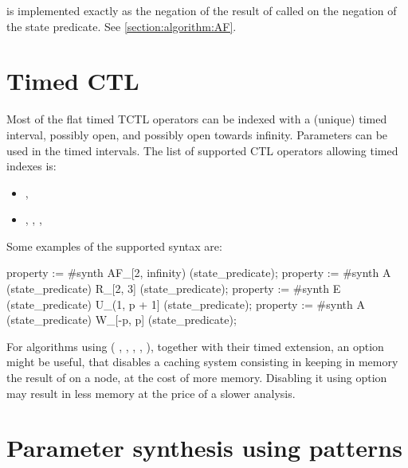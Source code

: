  is implemented exactly as the negation of the result of  called on the negation of the state predicate.
See \cref{section:algorithm:AF}.


\section{Timed CTL}\label{section:algorithm:timedCTL}

Most of the flat timed TCTL operators can be indexed with a (unique) timed interval, possibly open, and possibly open towards infinity.
Parameters can be used in the timed intervals.
The list of supported CTL operators allowing timed indexes is:
\begin{itemize}
	\item {}, 
	\item {}, , , 
\end{itemize}

Some examples of the supported syntax are:

\begin{IMITATORproperty}
property := #synth AF_[2, infinity) (state_predicate);
property := #synth A (state_predicate) R_[2, 3] (state_predicate);
property := #synth E (state_predicate) U_(1, p + 1] (state_predicate);
property := #synth A (state_predicate) W_[-p, p] (state_predicate);
\end{IMITATORproperty}


For algorithms using  (\ie{} , , , , ), together with their timed extension, an option  might be useful, that disables a caching system consisting in keeping in memory the result of  on a node, at the cost of more memory.
Disabling it using option  may result in less memory at the price of a slower analysis.



\section{Parameter synthesis using patterns}\label{section:algorithm:patterns}

